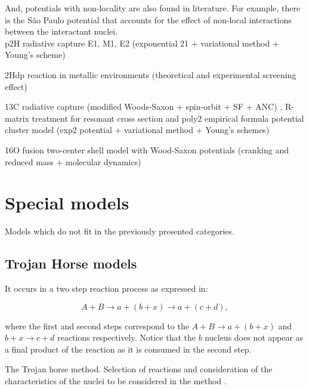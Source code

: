 \documentclass[openany]{book}
\begin{document}
And, potentials with non-locality are also found in literature. For example, there is the São Paulo potential that accounts for the effect of non-local interactions between the interactant nuclei. \\


p2H radiative capture E1, M1, E2 (exponential 21 + variational method + Young's scheme) \cite{dubovichenko_dzhazairov-kakhramanov_2009}

2Hdp reaction in metallic environments (theoretical and experimental screening effect)  \cite{czerski_huke_heide_ruprecht_2006}

13C radiative capture (modified Woods-Saxon + spin-orbit + SF + ANC) ,  R-matrix treatment for resonant cross section and poly2 empirical formula \cite{kabir_irgaziev_nabi_2020} potential cluster model (exp2 potential + variational method + Young's schemes)
\cite{dubovichenko_2012}


16O fusion two-center shell model with Wood-Saxon potentials (cranking and reduced mass + molecular dynamics) \cite{diaz-torres_gasques_wiescher_2007} \\


\section{Special models} \label{sec:specialModels}

Models which do not fit in the previously presented categories.

\subsection{Trojan Horse models} \label{sub:special_trojanHorse}

It occurs in a two step reaction process as expressed in:

\begin{equation}
	A + B \rightarrow a + (b + x)\rightarrow a + (c + d),
\end{equation}\label{eq: special_trojanHorse_reaction}

where the first and second steps correspond to the $A + B \rightarrow a + (b + x)$ and $b + x \rightarrow c + d$ reactions respectively. Notice that the $b$ nucleus does not appear as a final product of the reaction as it is consumed in the second step. 

The Trojan horse method. Selection of reactions and consideration of the characteristics of the nuclei to be considered in the method \cite{spitaleri_mukhamedzhanov_blokhintsev_cognata_pizzone_tumino_2011}.
\end{document}
